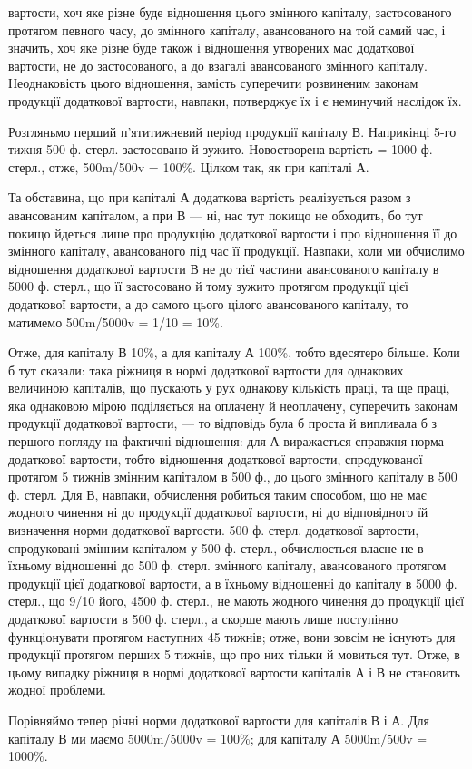 вартости, хоч яке різне буде відношення цього змінного капіталу, застосованого
протягом певного часу, до змінного капіталу, авансованого на
той самий час, і значить, хоч яке різне буде також і відношення утворених
мас додаткової вартости, не до застосованого, а до взагалі авансованого
змінного капіталу. Неоднаковість цього відношення, замість суперечити
розвиненим законам продукції додаткової вартости, навпаки,
потверджує їх і є неминучий наслідок їх.

Розгляньмо перший п’ятитижневий період продукції капіталу В. Наприкінці
5-го тижня 500 ф. стерл. застосовано й зужито. Новостворена
вартість = 1000 ф. стерл., отже, 500m/500v = 100\%. Цілком так, як при капіталі А.

Та обставина, що при капіталі А додаткова вартість реалізується разом з
авансованим капіталом, а при В — ні, нас тут покищо не обходить, бо
тут покищо йдеться лише про продукцію додаткової вартости і про
відношення її до змінного капіталу, авансованого під час її продукції.
Навпаки, коли ми обчислимо відношення додаткової вартости В не
до тієї частини авансованого капіталу в 5000 ф. стерл., що її застосовано й
тому зужито протягом продукції цієї додаткової вартости, а до самого
цього цілого авансованого капіталу, то матимемо 500m/5000v = 1/10 = 10\%.

Отже, для капіталу В 10\%, а для капіталу А 100\%, тобто вдесятеро
більше. Коли б тут сказали: така ріжниця в нормі додаткової вартости
для однакових величиною капіталів, що пускають у рух однакову кількість
праці, та ще праці, яка однаковою мірою поділяється на оплачену й
неоплачену, суперечить законам продукції додаткової вартости, — то
відповідь була б проста й випливала б з першого погляду на фактичні
відношення: для А виражається справжня норма додаткової вартости,
тобто відношення додаткової вартости, спродукованої протягом 5 тижнів
змінним капіталом в 500 ф., до цього змінного капіталу в 500 ф. стерл.
Для В, навпаки, обчислення робиться таким способом, що не має жодного
чинення ні до продукції додаткової вартости, ні до відповідного їй
визначення норми додаткової вартости. 500 ф. стерл. додаткової вартости,
спродуковані змінним капіталом у 500 ф. стерл., обчислюється
власне не в їхньому відношенні до 500 ф. стерл. змінного капіталу, авансованого
протягом продукції цієї додаткової вартости, а в їхньому відношенні
до капіталу в 5000 ф. стерл., що 9/10 його, 4500 ф. стерл., не мають
жодного чинення до продукції цієї додаткової вартости в 500 ф. стерл., а
скорше мають лише поступінно функціонувати протягом наступних 45 тижнів;
отже, вони зовсім не існують для продукції протягом перших 5 тижнів,
що про них тільки й мовиться тут. Отже, в цьому випадку ріжниця
в нормі додаткової вартости капіталів А і В не становить жодної
проблеми.

Порівняймо тепер річні норми додаткової вартости для капіталів В і А.
Для капіталу В ми маємо 5000m/5000v = 100\%; для капіталу А 5000m/500v = 1000\%.

